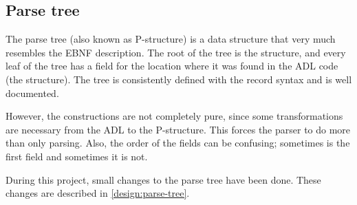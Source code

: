 
\subsection{Parse tree}
\label{analysis:parse-tree}
The parse tree (also known as P-structure) is a data structure that very much resembles the EBNF description.
The root of the tree is the  structure, and every leaf of the tree has a field for the location where it was found in the ADL code (the  structure).
The tree is consistently defined with the record syntax and is well documented.

However, the constructions are not completely pure, since some transformations are necessary from the ADL to the P-structure.
This forces the parser to do more than only parsing.
Also, the order of the fields can be confusing; sometimes  is the first field and sometimes it is not.

During this project, small changes to the parse tree have been done.
These changes are described in \autoref{design:parse-tree}.
